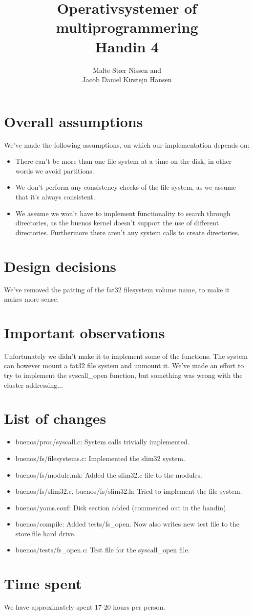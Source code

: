 \documentclass[11pt,a4paper]{article}
\title{Operativsystemer of multiprogrammering \\ Handin 4}
\author{Malte Stær Nissen and\\
        Jacob Daniel Kirstejn Hansen}
\begin{document}
\maketitle

\tableofcontents
\newpage

\section{Overall assumptions}
We've made the following assumptions, on which our implementation depends on:

\begin{itemize}
\item There can't be more than one file system at a time on the disk, in other
words we avoid partitions.
\item We don't perform any consistency checks of the file system, as we assume
that it's always consistent.
\item We assume we won't have to implement functionality to search through
directories, as the buenos kernel doesn't support the use of different
directories. Furthermore there aren't any system calls to create directories.
\end{itemize}

\section{Design decisions}
We've removed the patting of the fat32 filesystem volume name, to make it makes
more sense.  

\section{Important observations}
Unfortunately we didn't make it to implement some of the functions. The system
can however mount a fat32 file system and unmount it. We've made an effort to
try to implement the syscall\_open function, but something was wrong with the
cluster addressing...

\section{List of changes}

\begin{itemize}
\item buenos/proc/syscall.c: System calls trivially implemented.
\item buenos/fs/filesystems.c: Implemented the slim32 system.
\item buenos/fs/module.mk: Added the slim32.c file to the modules.
\item buenos/fs/slim32.c, buenos/fs/slim32.h: Tried to implement the file
system.
\item buenos/yams.conf: Disk section added (commented out in the handin).
\item buenos/compile: Added tests/fs\_open. Now also writes new test file to
the store.file hard drive.
\item buenos/tests/fs\_open.c: Test file for the syscall\_open file. 
\end{itemize}

\section{Time spent}

We have approximately spent 17-20 hours per person.
\end{document}

